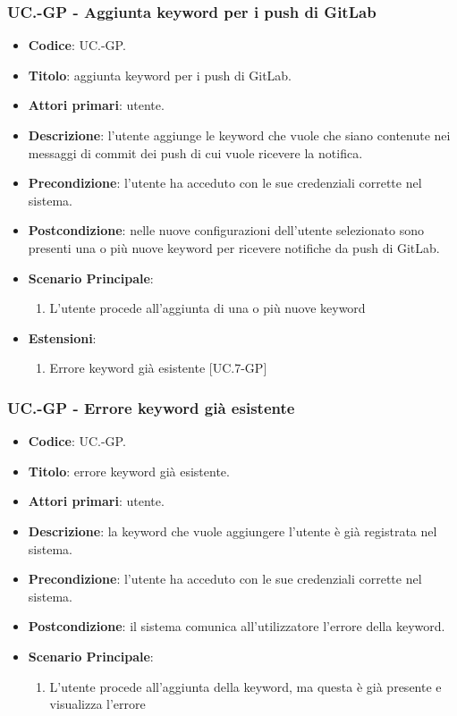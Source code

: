 	\subsubsection{UC\theuccount.\thesubuccount-GP - Aggiunta keyword per i push di GitLab}
		
		\begin{itemize}
			\item \textbf{Codice}: UC\theuccount.\thesubuccount-GP.
			\item \textbf{Titolo}: aggiunta keyword per i push di GitLab.
			\item \textbf{Attori primari}: utente.
			\item \textbf{Descrizione}: l’utente aggiunge le keyword che vuole che siano contenute nei messaggi di commit dei push di cui vuole ricevere la notifica.
			\item \textbf{Precondizione}: l’utente ha acceduto con le sue credenziali corrette nel sistema.
			\item \textbf{Postcondizione}: nelle nuove configurazioni dell'utente selezionato sono presenti una o più nuove keyword per ricevere notifiche da push di GitLab.
			\item \textbf{Scenario Principale}:
			\begin{enumerate}
				\item L'utente procede all'aggiunta di una o più nuove keyword
			\end{enumerate}
			\item \textbf{Estensioni}:
			\begin{enumerate}
				\item Errore keyword già esistente [UC\theuccount.7-GP]
			\end{enumerate}
		\end{itemize}
	
	\subsubsection{UC\theuccount.\thesubuccount-GP - Errore keyword già esistente}
	
	\begin{itemize}
		\item \textbf{Codice}: UC\theuccount.\thesubuccount-GP.
		\item \textbf{Titolo}: errore keyword già esistente.
		\item \textbf{Attori primari}: utente.
		\item \textbf{Descrizione}: la keyword che vuole aggiungere l'utente è già registrata nel sistema.
		\item \textbf{Precondizione}:  l’utente ha acceduto con le sue credenziali corrette nel sistema.
		\item \textbf{Postcondizione}: il sistema comunica all’utilizzatore l’errore della keyword.
		\item \textbf{Scenario Principale}:
		\begin{enumerate}
			\item L'utente procede all'aggiunta della keyword, ma questa è già presente e visualizza l'errore
		\end{enumerate}
	\end{itemize}